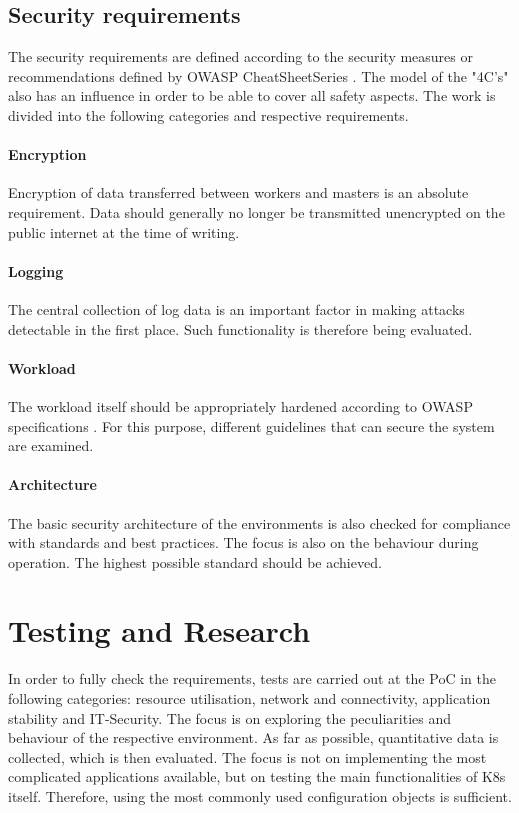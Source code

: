 \documentclass[MIC,Master,english]{twbook}%
\begin{document}
\subsection{Security requirements}
The security requirements are defined according to the security measures or recommendations defined by OWASP CheatSheetSeries \cite{owasp-k8s-cheat}. The model of the "4C's" \cite{k8s-4cs} also has an influence in order to be able to cover all safety aspects. The work is divided into the following categories and respective requirements.
\paragraph{Encryption} Encryption of data transferred between workers and masters is an absolute requirement. Data should generally no longer be transmitted unencrypted on the public internet at the time of writing.
\paragraph{Logging} The central collection of log data is an important factor in making attacks detectable in the first place. Such functionality is therefore being evaluated.
\paragraph{Workload} The workload itself should be appropriately hardened according to OWASP specifications \cite{owasp-k8s-cheat}. For this purpose, different guidelines that can secure the system are examined.
\paragraph{Architecture} The basic security architecture of the environments is also checked for compliance with standards and best practices. The focus is also on the behaviour during operation. The highest possible standard should be achieved.

\section{Testing and Research}
In order to fully check the requirements, tests are carried out at the \ac{PoC} in the following categories: resource utilisation, network and connectivity, application stability and IT-Security. The focus is on exploring the peculiarities and behaviour of the respective environment. As far as possible, quantitative data is collected, which is then evaluated. The focus is not on implementing the most complicated applications available, but on testing the main functionalities of \ac{K8s} itself. Therefore, using the most commonly used configuration objects is sufficient.
\end{document}
